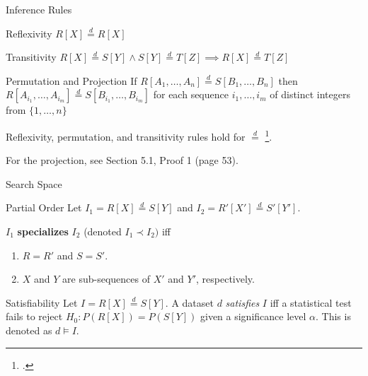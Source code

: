 \documentclass[10pt]{beamer}
\newcommand{\eqdist}{\stackrel{d}{=}}
\begin{document}
\begin{frame}{Inference Rules}
    \begin{block}{Reflexivity}
        $R[X] \eqdist R[X]$
    \end{block}
    \begin{block}{Transitivity}
        $ R[X] \eqdist S[Y] \land S[Y] \eqdist T[Z] \implies R[X] \eqdist T[Z]$
    \end{block}
    \begin{block}{Permutation and \alert{Projection}}
        If $R[A_1,\dots,A_n] \eqdist S[B_1,\dots,B_n]$ then
        $R[A_{i_1},\dots,A_{i_m}] \eqdist S[B_{i_1},\dots,B_{i_m}]$ for each sequence
        $i_1,\dots,i_m$ of distinct integers from $\{1,\dots,n\}$
    \end{block}
    
    Reflexivity, permutation, and transitivity rules hold
    for $\eqdist$ \footcite{randles1979introduction}.

    For the projection, see \alert{Section 5.1, Proof 1} (page 53).
\end{frame}

\begin{frame}{Search Space}
    \begin{block}{Partial Order}
        Let $I_1 = R[X] \eqdist S[Y]$ and $I_2 = R'[X'] \eqdist S'[Y']$.
        
        $I_1$ \textbf{specializes} $I_2$ (denoted $I_1 \prec I_2)$ iff
        \begin{enumerate}
            \item $R = R'$ and $S = S'$.
            \item $X$ and $Y$ are sub-sequences of $X'$ and $Y'$, respectively.
        \end{enumerate}
    \end{block}

    \begin{block}{Satisfiability}
    Let $I = R[X] \eqdist S[Y]$.
    A dataset $d$ \emph{satisfies} $I$ iff  a statistical test fails to reject $H_0: P(R[X]) = P(S[Y])$
    given a significance level $\alpha$.
    This is denoted as $d \models I$.
    \end{block}

\end{frame}
\end{document}
